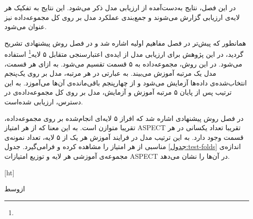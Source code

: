 

در این فصل، نتایج به‌دست‌آمده از ارزیابی مدل ذکر می‌شود.
این نتایج به تفکیک هر لایه‌ی ارزیابی گزارش می‌شوند و جمع‌بندی عملکرد مدل بر روی کل مجموعه‌داده نیز عنوان می‌شود.


همانطور که پیش‌تر در فصل مفاهیم اولیه اشاره شد و در فصل روش پیشنهادی تشریح گردید، در این پژوهش برای ارزیابی مدل از ایده‌ی 
اعتبارسنجی متقابل ۵ لایه\footnote{}
استفاده می‌شود.
در این روش، مجموعه‌داده به ۵ قسمت تقسیم می‌شود.
به ازای هر قسمت، مدل یک مرتبه آموزش می‌بیند.
به عبارتی در هر مرتبه،  مدل بر روی یک‌پنجم انتخاب‌شده‌ی داده‌ها آزمایش می‌شود و از چهار‌پنجم باقی‌مانده‌ی آن‌ها می‌آموزد.
به این ترتیب پس از پایان ۵ مرتبه آموزش و آزمایش، مدل بر روی کل مجموعه‌داده‌ی در دسترس، ارزیابی شده‌است.

در فصل روش پیشنهادی اشاره شد که افراز ۵ لایه‌ای انجام‌شده بر روی مجموعه‌داده، تقریبا متوازن است.
به این معنا که از هر امتیاز ASPECT تقریبا تعداد یکسانی در هر قسمت وجود دارد.
به این ترتیب مدل در فرایند آموزش هر یک از ۵ لایه، تعداد نمونه‌ی مناسبی از هر امتیاز را مشاهده کرده و فرامی‌گیرد.
جدول \ref{جدول:test-folds} اندازه‌ی مجموعه‌ی آموزشی هر لایه و توزیع امتیازات ASPECT در آن‌ها را نشان می‌دهد.

[ht]

\vspace{1.5em}

‌ازوسط

